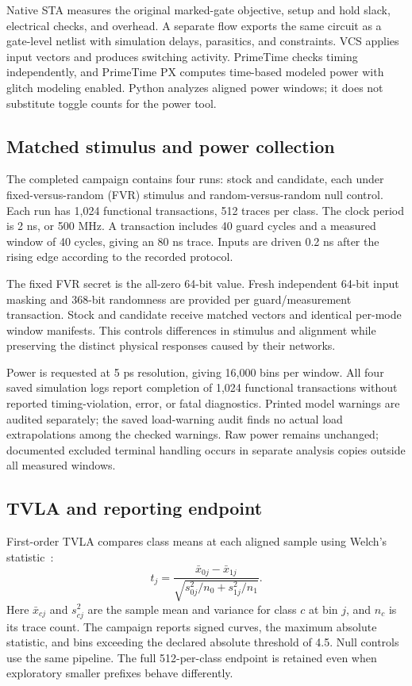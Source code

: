 \documentclass[conference]{IEEEtran}
\begin{document}
Native STA measures the original marked-gate objective, setup and hold slack, electrical checks, and overhead. A separate flow exports the same circuit as a gate-level netlist with simulation delays, parasitics, and constraints. VCS applies input vectors and produces switching activity. PrimeTime checks timing independently, and PrimeTime PX computes time-based modeled power with glitch modeling enabled. Python analyzes aligned power windows; it does not substitute toggle counts for the power tool.

\subsection{Matched stimulus and power collection}
The completed campaign contains four runs: stock and candidate, each under fixed-versus-random (FVR) stimulus and random-versus-random null control. Each run has 1,024 functional transactions, 512 traces per class. The clock period is 2 ns, or 500 MHz. A transaction includes 40 guard cycles and a measured window of 40 cycles, giving an 80 ns trace. Inputs are driven 0.2 ns after the rising edge according to the recorded protocol.

The fixed FVR secret is the all-zero 64-bit value. Fresh independent 64-bit input masking and 368-bit randomness are provided per guard/measurement transaction. Stock and candidate receive matched vectors and identical per-mode window manifests. This controls differences in stimulus and alignment while preserving the distinct physical responses caused by their networks.

Power is requested at 5 ps resolution, giving 16,000 bins per window. All four saved simulation logs report completion of 1,024 functional transactions without reported timing-violation, error, or fatal diagnostics. Printed model warnings are audited separately; the saved load-warning audit finds no actual load extrapolations among the checked warnings. Raw power remains unchanged; documented excluded terminal handling occurs in separate analysis copies outside all measured windows.

\subsection{TVLA and reporting endpoint}
First-order TVLA compares class means at each aligned sample using Welch's statistic~\cite{tvla}:
\begin{equation}
t_j=\frac{\bar x_{0j}-\bar x_{1j}}{\sqrt{s_{0j}^{2}/n_0+s_{1j}^{2}/n_1}}.
\label{eq:welch}
\end{equation}
Here $\bar x_{cj}$ and $s_{cj}^{2}$ are the sample mean and variance for class $c$ at bin $j$, and $n_c$ is its trace count. The campaign reports signed curves, the maximum absolute statistic, and bins exceeding the declared absolute threshold of 4.5. Null controls use the same pipeline. The full 512-per-class endpoint is retained even when exploratory smaller prefixes behave differently.
\end{document}
